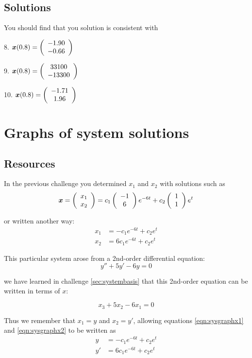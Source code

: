 \subsection*{Solutions}
You should find that you solution is consistent with

8. $\displaystyle \bm{x}(0.8) = \left(\begin{array}{c}{-1.90}\\{-0.66}\end{array}\right)$

9. $\displaystyle \bm{x}(0.8) = \left(\begin{array}{c}{33100}\\{-13300}\end{array}\right)$

10. $\displaystyle \bm{x}(0.8) = \left(\begin{array}{c}{-1.71}\\{1.96}\end{array}\right)$





\newpage
\section{Graphs of system solutions}

\subsection*{Resources}
In the previous challenge you determined $x_1$ and $x_2$ with solutions such as
\begin{equation}
    \bm{x} = \left(\begin{array}{c}{x_1}\\{x_2}\end{array}\right) = c_1 \left(\begin{array}{c}{-1}\\{6}\end{array}\right) e^{-6t} + c_2 \left(\begin{array}{c}{1}\\{1}\end{array}\right) e^t
\end{equation}

or written another way:
\begin{align}
    x_1 &= -c_1 e^{-6t} + c_2 e^t \label{eqn:sysgraphx1} \\
    x_2 &= 6 c_1 e^{-6t} + c_2 e^t \label{eqn:sysgraphx2} 
\end{align}

This particular system arose from a 2nd-order differential equation:
\begin{equation}
    y'' + 5y' - 6y = 0 \label{eqn:sys2ndoode}
\end{equation}

we have learned in challenge \ref{sec:systembasis} that this 2nd-order equation can be written in terms of $x$:

\begin{equation}
    x_3 + 5x_2 - 6 x_1 = 0
\end{equation}

Thus we remember that $x_1 = y$ and $x_2 = y'$, allowing equations \ref{eqn:sysgraphx1} and \ref{eqn:sysgraphx2} to be written as
\begin{align}
    y &= -c_1 e^{-6t} + c_2 e^t \label{eqn:syspos} \\
    y' &= 6 c_1 e^{-6t} + c_2 e^t \label{eqn:sysvel} 
\end{align}

